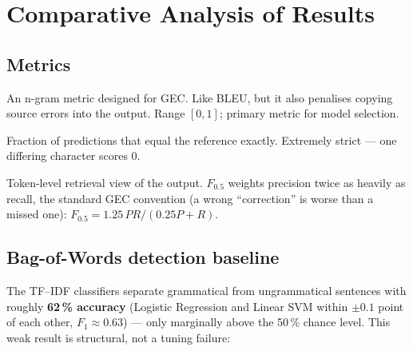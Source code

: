 \documentclass[11pt,a4paper]{article}
\begin{document}
\section{Comparative Analysis of Results}
\label{sec:results}
\subsection{Metrics}
\begin{description}[leftmargin=1.4em,style=nextline]
  \item[GLEU] An n-gram metric designed for GEC. Like BLEU, but it also
        penalises copying source errors into the output. Range $[0,1]$;
        primary metric for model selection.
  \item[Exact Match (EM)] Fraction of predictions that equal the reference
        exactly. Extremely strict --- one differing character scores 0.
  \item[Precision / Recall / $F_{0.5}$] Token-level retrieval view of the
        output. $F_{0.5}$ weights precision twice as heavily as recall, the
        standard GEC convention (a wrong ``correction'' is worse than a missed
        one): $F_{0.5}=1.25\,PR/(0.25P+R)$.
\end{description}

\subsection{Bag-of-Words detection baseline}
The TF--IDF classifiers separate grammatical from ungrammatical sentences with
roughly \textbf{62\,\% accuracy} (Logistic Regression and Linear SVM within
$\pm0.1$ point of each other, $F_1\approx0.63$) --- only marginally above the
50\,\% chance level. This weak result is structural, not a tuning failure:
\end{document}
